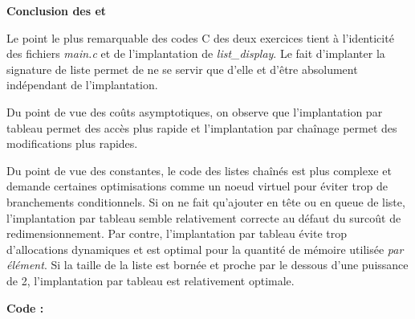 \documentclass[../main.tex]{subfiles}
\begin{document}
 \textbf{Conclusion des  et }

 Le point le plus remarquable des codes C des deux exercices tient à l'identicité des fichiers \textit{main.c} et de l'implantation de \textit{list\_display}. Le fait d'implanter la signature de liste permet de ne se servir que d'elle et d'être absolument indépendant de l'implantation.

 Du point de vue des coûts asymptotiques, on observe que l'implantation par tableau permet des accès plus rapide et l'implantation par chaînage permet des modifications plus rapides.

 Du point de vue des constantes, le code des listes chaînés est plus complexe et demande certaines optimisations comme un noeud virtuel pour éviter trop de branchements conditionnels. Si on ne fait qu'ajouter en tête ou en queue de liste, l'implantation par tableau semble relativement correcte au défaut du surcoût de redimensionnement. Par contre, l'implantation par tableau évite trop d'allocations dynamiques et est optimal pour la quantité de mémoire utilisée \textit{par élément}. Si la taille de la liste est bornée et proche par le dessous d'une puissance de 2, l'implantation par tableau est relativement optimale.



\textbf{Code :} 
\end{document}
